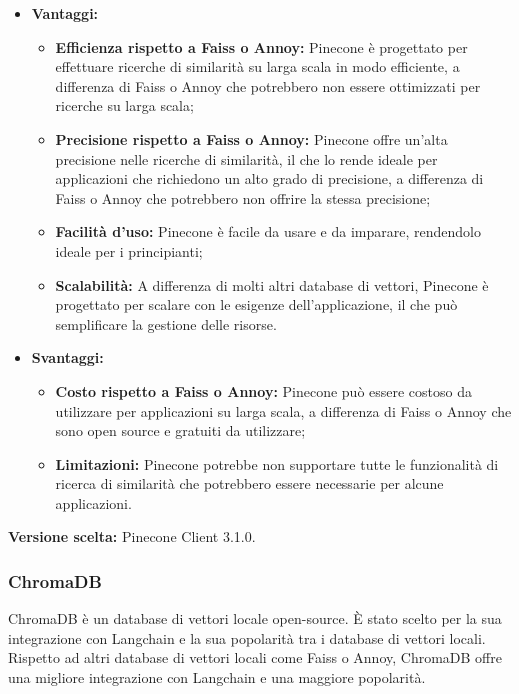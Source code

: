 \documentclass[10pt, a4paper]{article}
\begin{document}
\begin{itemize}
\item \textbf{Vantaggi:}
\begin{itemize}
\item \textbf{Efficienza rispetto a Faiss o Annoy:} Pinecone è progettato per effettuare ricerche di similarità su larga scala in modo efficiente, a differenza di Faiss o Annoy che potrebbero non essere ottimizzati per ricerche su larga scala;
\item \textbf{Precisione rispetto a Faiss o Annoy:} Pinecone offre un'alta precisione nelle ricerche di similarità, il che lo rende ideale per applicazioni che richiedono un alto grado di precisione, a differenza di Faiss o Annoy che potrebbero non offrire la stessa precisione;
\item \textbf{Facilità d'uso:} Pinecone è facile da usare e da imparare, rendendolo ideale per i principianti;
\item \textbf{Scalabilità:} A differenza di molti altri database di vettori, Pinecone è progettato per scalare con le esigenze dell'applicazione, il che può semplificare la gestione delle risorse.
\end{itemize}
\item \textbf{Svantaggi:}
\begin{itemize}
\item \textbf{Costo rispetto a Faiss o Annoy:} Pinecone può essere costoso da utilizzare per applicazioni su larga scala, a differenza di Faiss o Annoy che sono open source e gratuiti da utilizzare;
\item \textbf{Limitazioni:} Pinecone potrebbe non supportare tutte le funzionalità di ricerca di similarità che potrebbero essere necessarie per alcune applicazioni.
\end{itemize}
\end{itemize}
\textbf{Versione scelta:} Pinecone Client 3.1.0.

\subsubsection{ChromaDB}
ChromaDB è un database di vettori locale open-source. È stato scelto per la sua integrazione con Langchain e la sua popolarità tra i database di vettori locali. Rispetto ad altri database di vettori locali come Faiss o Annoy, ChromaDB offre una migliore integrazione con Langchain e una maggiore popolarità.
\end{document}

